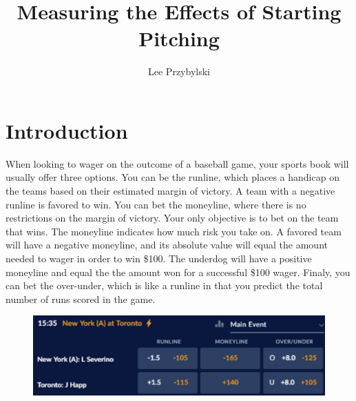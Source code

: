 \documentclass [52pt] {article}
\title{Measuring the Effects of Starting Pitching}
\author{Lee Przybylski}
\begin{document}
\maketitle
{}


\section{Introduction}

When looking to wager on the outcome of a baseball game, your sports book will usually offer three options.  You can be the runline, which places a handicap on the teams based on their estimated margin of victory.  A team with a negative runline is favored to win.  You can bet the moneyline, where there is no restrictions on the margin of victory.  Your only objective is to bet on the team that wins.  The moneyline indicates how much risk you take on.  A favored team will have a negative moneyline, and its absolute value will equal the amount needed to wager in order to win \$100.  The underdog will have a positive moneyline and equal the the amount won for a successful \$100 wager.  Finaly, you can bet the over-under, which is like a runline in that you predict the total number of runs scored in the game.
\begin{figure}[h!]
    \centering
    \includegraphics[scale = 0.7]{mlb-odds-2.png}
\end{figure}
\end{document}
